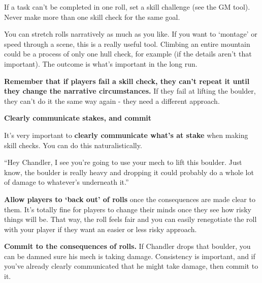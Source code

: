 If a task can't be completed in one roll, set a skill challenge (see the GM tool). Never make more
than one skill check for the same goal.


You can stretch rolls narratively as much as you like. If you want to `montage' or speed through a
scene, this is a really useful tool. Climbing an entire mountain could be a process of only one hull
check, for example (if the details aren't that important). The outcome is what's important in the
long run.

\textbf{Remember that if players fail a skill check, they can't repeat it until they change the
narrative circumstances.} If they fail at lifting the boulder, they can't do it the same way again -
they need a different approach.

\begin{center}
\textbf{Clearly communicate stakes, and commit}
\end{center}

It's very important to \textbf{clearly communicate what's at stake} when making skill checks. You can
do this naturalistically.

\quad``Hey Chandler, I see you're going to use your mech to lift this boulder. Just know, the
boulder is really heavy and dropping it could probably do a whole lot of damage to whatever's
underneath it.''

\textbf{Allow players to `back out' of rolls} once the consequences are made clear to them. It's totally
fine for players to change their minds once they see how risky things will be. That way, the roll
feels fair and you can easily renegotiate the roll with your player if they want an easier or less
risky approach.

\textbf{Commit to the consequences of rolls.} If Chandler drops that boulder, you can be damned sure
his mech is taking damage. Consistency is important, and if you've already clearly
communicated that he might take damage, then commit to it.

